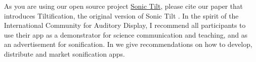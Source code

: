 \documentclass[a4paper,10pt,oneside]{article}
\begin{document}
\begin{sloppy}
As you are using our open source project \href{https://github.com/Tiltification/sonic-tilt}{Sonic Tilt}, please cite our paper that introduces Tiltification, the original version of Sonic Tilt \cite{tilt}. In the spirit of the International Community for Auditory Display, I recommend all participants to use their app as a demonstrator for science communication and teaching, and as an advertisement for sonification. In \cite{recommendations} we give recommendations on how to develop, distribute and market sonification apps.


%
% 
%
% 

\end{sloppy}
\end{document}
